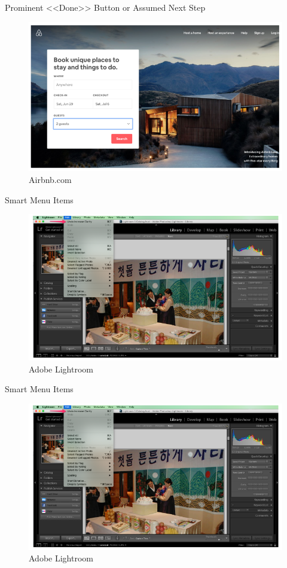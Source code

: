 \documentclass{beamer}
\begin{document}
\begin{frame}[t]{Prominent <<Done>> Button or Assumed Next Step}
	\begin{figure}[h]
		\centering
		\includegraphics[scale=0.6]{images/lec08-pic13.png}
		\caption{Airbnb.com}
	\end{figure}
\end{frame}

\begin{frame}[t]{Smart Menu Items}
	\begin{figure}[h]
		\centering
		\includegraphics[scale=0.6]{images/lec08-pic14.png}
		\caption{Adobe Lightroom}
	\end{figure}
\end{frame}

\begin{frame}[t]{Smart Menu Items}
	\begin{figure}[h]
		\centering
		\includegraphics[scale=0.6]{images/lec08-pic14.png}
		\caption{Adobe Lightroom}
	\end{figure}
\end{frame}
\end{document}
